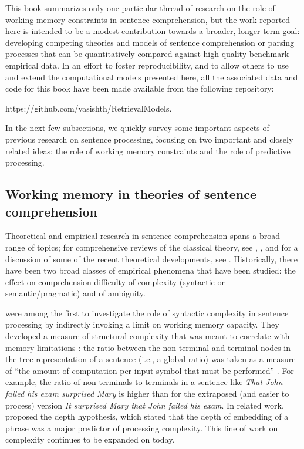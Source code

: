 \documentclass{cambridge7A}\usepackage[]{graphicx}\usepackage[]{color}
\begin{document}
This book summarizes only one particular thread of research on the role of  
working memory constraints in sentence comprehension, but the work
reported here is intended to be a modest contribution towards a
broader, longer-term goal: developing competing theories and models of sentence
comprehension or parsing processes that can be quantitatively compared
against high-quality benchmark empirical data.  In an effort to foster
reproducibility, and to allow others to use and extend the
computational models presented here, all the associated data and code
for this book have been made available from the following repository:

https://github.com/vasishth/RetrievalModels.

In the next few subsections, we quickly survey some important aspects of previous research on sentence processing, focusing on two important and closely related ideas: the role of working memory constraints and the role of predictive processing.

\subsection{Working memory in theories of sentence comprehension}


Theoretical and empirical research in sentence comprehension spans a
broad range of topics; for comprehensive reviews of the classical
theory, see \cite{Frazier1987}, \cite{PickeringVanGompel2006}, and for
a discussion of some of the recent theoretical developments, see
\cite{traxler2014trends}. Historically, there have been two broad
classes of empirical phenomena that have been studied: the effect on
comprehension difficulty of complexity (syntactic or
semantic/pragmatic) and of ambiguity.

\cite{MillerChomsky63} were among the first to investigate the role of 
syntactic complexity in sentence processing by indirectly invoking a
limit on working memory capacity. They developed a measure of 
structural complexity that was meant to correlate with memory
limitations \cite[480-482]{MillerChomsky63}: the ratio between the
non-terminal and terminal nodes in the tree-representation of a
sentence (i.e., a global ratio) was taken as a measure of ``the amount
of computation per input symbol that must be performed''
\cite[480]{MillerChomsky63}.  For example, the ratio of non-terminals
to terminals in a sentence like \textit{That John failed his exam
surprised Mary} is higher than for the extraposed (and easier
to process) version \textit{It surprised Mary that John failed his
exam}.  In related work, \cite{yngve} proposed the depth hypothesis, 
which stated that the depth of embedding of a phrase was a major
predictor of processing complexity. This line of work on complexity
continues to be expanded on today.
\end{document}
